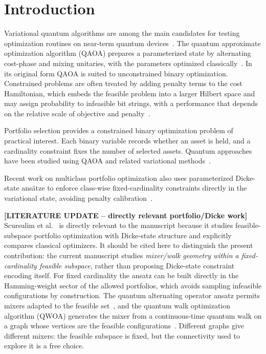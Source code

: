 \section{\label{sec:intro}Introduction}

Variational quantum algorithms are among the main candidates for testing optimization routines on near-term quantum devices~\cite{Cerezo2021,Moll2018}. The quantum approximate optimization algorithm (QAOA) prepares a parameterized state by alternating cost-phase and mixing unitaries, with the parameters optimized classically~\cite{Farhi2014,Blekos2024}. In its original form QAOA is suited to unconstrained binary optimization. Constrained problems are often treated by adding penalty terms to the cost Hamiltonian, which embeds the feasible problem into a larger Hilbert space and may assign probability to infeasible bit strings, with a performance that depends on the relative scale of objective and penalty~\cite{Hadfield2019,Blekos2024}.

Portfolio selection provides a constrained binary optimization problem of practical interest. Each binary variable records whether an asset is held, and a cardinality constraint fixes the number of selected assets. Quantum approaches have been studied using QAOA and related variational methods~\cite{Hodson2019,Slate2021}.

Recent work on multiclass portfolio optimization also uses parameterized Dicke-state ans\"atze to enforce class-wise fixed-cardinality constraints directly in the variational state, avoiding penalty calibration~\cite{Scursulim2026}.

{\color{red}\textbf{[LITERATURE UPDATE -- directly relevant portfolio/Dicke work]} Scursulim et al.~\cite{Scursulim2026} is directly relevant to the manuscript because it studies feasible-subspace portfolio optimization with Dicke-state structure and explicitly compares classical optimizers. It should be cited here to distinguish the present contribution: the current manuscript studies \emph{mixer/walk geometry within a fixed-cardinality feasible subspace}, rather than proposing Dicke-state constraint encoding itself.} For fixed cardinality the ansatz can be built directly in the Hamming-weight sector of the allowed portfolios, which avoids sampling infeasible configurations by construction. The quantum alternating operator ansatz permits mixers adapted to the feasible set~\cite{Hadfield2019}, and the quantum walk optimization algorithm (QWOA) generates the mixer from a continuous-time quantum walk on a graph whose vertices are the feasible configurations~\cite{Marsh2019,Marsh2020}. Different graphs give different mixers: the feasible subspace is fixed, but the connectivity used to explore it is a free choice.


